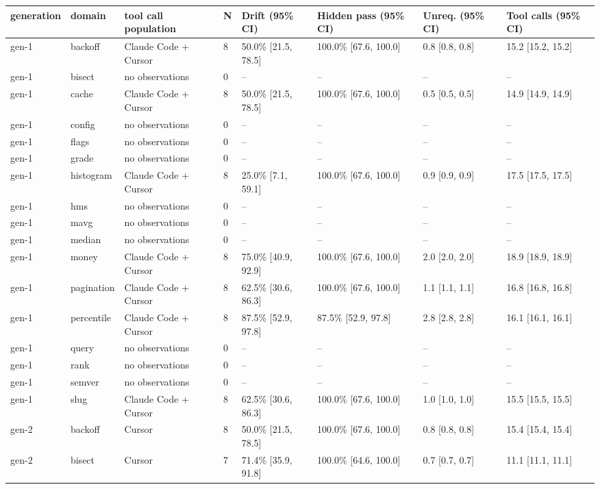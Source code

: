 \begin{tabular}{llllllll}
\toprule
generation & domain & tool call population & N & Drift (95\% CI) & Hidden pass (95\% CI) & Unreq. (95\% CI) & Tool calls (95\% CI) \\
\midrule
gen-1 & backoff & Claude Code + Cursor & 8 & 50.0\% [21.5, 78.5] & 100.0\% [67.6, 100.0] & 0.8 [0.8, 0.8] & 15.2 [15.2, 15.2] \\
gen-1 & bisect & no observations & 0 & -- & -- & -- & -- \\
gen-1 & cache & Claude Code + Cursor & 8 & 50.0\% [21.5, 78.5] & 100.0\% [67.6, 100.0] & 0.5 [0.5, 0.5] & 14.9 [14.9, 14.9] \\
gen-1 & config & no observations & 0 & -- & -- & -- & -- \\
gen-1 & flags & no observations & 0 & -- & -- & -- & -- \\
gen-1 & grade & no observations & 0 & -- & -- & -- & -- \\
gen-1 & histogram & Claude Code + Cursor & 8 & 25.0\% [7.1, 59.1] & 100.0\% [67.6, 100.0] & 0.9 [0.9, 0.9] & 17.5 [17.5, 17.5] \\
gen-1 & hms & no observations & 0 & -- & -- & -- & -- \\
gen-1 & mavg & no observations & 0 & -- & -- & -- & -- \\
gen-1 & median & no observations & 0 & -- & -- & -- & -- \\
gen-1 & money & Claude Code + Cursor & 8 & 75.0\% [40.9, 92.9] & 100.0\% [67.6, 100.0] & 2.0 [2.0, 2.0] & 18.9 [18.9, 18.9] \\
gen-1 & pagination & Claude Code + Cursor & 8 & 62.5\% [30.6, 86.3] & 100.0\% [67.6, 100.0] & 1.1 [1.1, 1.1] & 16.8 [16.8, 16.8] \\
gen-1 & percentile & Claude Code + Cursor & 8 & 87.5\% [52.9, 97.8] & 87.5\% [52.9, 97.8] & 2.8 [2.8, 2.8] & 16.1 [16.1, 16.1] \\
gen-1 & query & no observations & 0 & -- & -- & -- & -- \\
gen-1 & rank & no observations & 0 & -- & -- & -- & -- \\
gen-1 & semver & no observations & 0 & -- & -- & -- & -- \\
gen-1 & slug & Claude Code + Cursor & 8 & 62.5\% [30.6, 86.3] & 100.0\% [67.6, 100.0] & 1.0 [1.0, 1.0] & 15.5 [15.5, 15.5] \\
gen-2 & backoff & Cursor & 8 & 50.0\% [21.5, 78.5] & 100.0\% [67.6, 100.0] & 0.8 [0.8, 0.8] & 15.4 [15.4, 15.4] \\
gen-2 & bisect & Cursor & 7 & 71.4\% [35.9, 91.8] & 100.0\% [64.6, 100.0] & 0.7 [0.7, 0.7] & 11.1 [11.1, 11.1] \\

\end{tabular}
